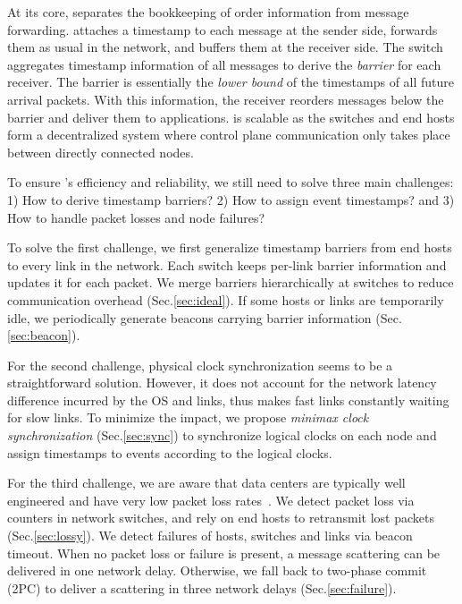 At its core, \sys separates the bookkeeping of order information from message forwarding.
\sys attaches a timestamp to each message at the sender side, forwards them as usual in the network, and buffers them at the receiver side.
The switch aggregates timestamp information of all messages to derive the \textit{barrier} for each receiver.
The barrier is essentially the \textit{lower bound} of the timestamps of all future arrival packets.
With this information, the receiver reorders messages below the barrier and deliver them to applications.
\sys is scalable as the switches and end hosts form a decentralized system where control plane communication only takes place between directly connected nodes.

To ensure \sys's efficiency and reliability, we still need to solve three main challenges: 1) How to derive timestamp barriers? 2) How to assign event timestamps? and 3) How to handle packet losses and node failures?

To solve the first challenge, we first generalize timestamp barriers from end hosts to every link in the network.
Each switch keeps per-link barrier information and updates it for each packet.
We merge barriers hierarchically at switches to reduce communication overhead (Sec.\ref{sec:ideal}).
If some hosts or links are temporarily idle, we periodically generate beacons carrying barrier information (Sec.\ref{sec:beacon}).


For the second challenge, physical clock synchronization seems to be a straightforward solution.
However, it does not account for the network latency difference incurred by the OS and links, thus makes fast links constantly waiting for slow links.
To minimize the impact, we propose \textit{minimax clock synchronization} (Sec.\ref{sec:sync}) to synchronize logical clocks on each node and assign timestamps to events according to the logical clocks.

For the third challenge, we are aware that data centers are typically well engineered and have very low packet loss rates~\cite{ports2015designing}.
We detect packet loss via counters in network switches, and rely on end hosts to retransmit lost packets (Sec.\ref{sec:lossy}).
We detect failures of hosts, switches and links via beacon timeout.
When no packet loss or failure is present, a message scattering can be delivered in one network delay. Otherwise, we fall back to two-phase commit (2PC) to deliver a scattering in three network delays (Sec.\ref{sec:failure}).

